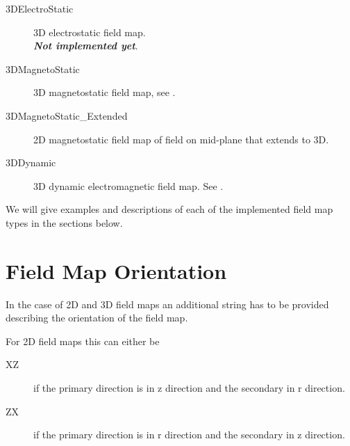 \begin{description}
\item[3DElectroStatic] \Newline
3D electrostatic field map.\\
\textbf{\emph{Not implemented yet}}.

\item[3DMagnetoStatic] \Newline
3D magnetostatic field map, see .

\item[{3DMagnetoStatic\_Extended}] \Newline
2D magnetostatic field map of field on mid-plane that \opal extends to 3D.\\

\item[3DDynamic] \Newline
3D dynamic electromagnetic field map. See .
\end{description}

We will give examples and descriptions of each of the implemented field map types in the sections below.

\section{Field Map Orientation}
\label{sec:fieldorientation}
In the case of 2D and 3D field maps an additional string has to be provided describing the orientation of the field map.

For 2D field maps this can either be
\begin{description}
\item[XZ]\Newline
if the primary direction is in z direction and the secondary in r direction.
\item[ZX]\Newline
if the primary direction is in r direction and the secondary in z direction.
\end{description}

